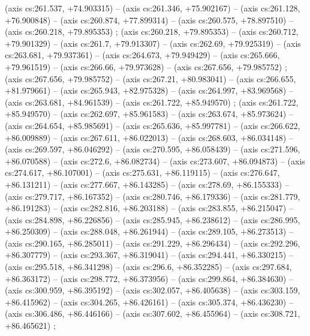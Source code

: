     (axis cs:261.537,    +74.903315) --  (axis cs:261.346,    +75.902167) --  (axis cs:261.128,    +76.900848) --  (axis cs:260.874,    +77.899314) --  (axis cs:260.575,    +78.897510) --  (axis cs:260.218,    +79.895353) ;
    (axis cs:260.218,    +79.895353) --  (axis cs:260.712,    +79.901329) --  (axis cs:261.7,    +79.913307) --  (axis cs:262.69,    +79.925319) --  (axis cs:263.681,    +79.937361) --  (axis cs:264.673,    +79.949429) --  (axis cs:265.666,    +79.961519) --  (axis cs:266.66,    +79.973628) --  (axis cs:267.656,    +79.985752) ;
    (axis cs:267.656,    +79.985752) --  (axis cs:267.21,    +80.983041) --  (axis cs:266.655,    +81.979661) --  (axis cs:265.943,    +82.975328) --  (axis cs:264.997,    +83.969568) --  (axis cs:263.681,    +84.961539) --  (axis cs:261.722,    +85.949570) ;
    (axis cs:261.722,    +85.949570) --  (axis cs:262.697,    +85.961583) --  (axis cs:263.674,    +85.973624) --  (axis cs:264.654,    +85.985691) --  (axis cs:265.636,    +85.997781) --  (axis cs:266.622,    +86.009889) --  (axis cs:267.611,    +86.022013) --  (axis cs:268.603,    +86.034148) --  (axis cs:269.597,    +86.046292) --  (axis cs:270.595,    +86.058439) --  (axis cs:271.596,    +86.070588) --  (axis cs:272.6,    +86.082734) --  (axis cs:273.607,    +86.094873) --  (axis cs:274.617,    +86.107001) --  (axis cs:275.631,    +86.119115) --  (axis cs:276.647,    +86.131211) --  (axis cs:277.667,    +86.143285) --  (axis cs:278.69,    +86.155333) --  (axis cs:279.717,    +86.167352) --  (axis cs:280.746,    +86.179336) --  (axis cs:281.779,    +86.191283) --  (axis cs:282.816,    +86.203188) --  (axis cs:283.855,    +86.215047) --  (axis cs:284.898,    +86.226856) --  (axis cs:285.945,    +86.238612) --  (axis cs:286.995,    +86.250309) --  (axis cs:288.048,    +86.261944) --  (axis cs:289.105,    +86.273513) --  (axis cs:290.165,    +86.285011) --  (axis cs:291.229,    +86.296434) --  (axis cs:292.296,    +86.307779) --  (axis cs:293.367,    +86.319041) --  (axis cs:294.441,    +86.330215) --  (axis cs:295.518,    +86.341298) --  (axis cs:296.6,    +86.352285) --  (axis cs:297.684,    +86.363172) --  (axis cs:298.772,    +86.373956) --  (axis cs:299.864,    +86.384630) --  (axis cs:300.959,    +86.395192) --  (axis cs:302.057,    +86.405638) --  (axis cs:303.159,    +86.415962) --  (axis cs:304.265,    +86.426161) --  (axis cs:305.374,    +86.436230) --  (axis cs:306.486,    +86.446166) --  (axis cs:307.602,    +86.455964) --  (axis cs:308.721,    +86.465621) ;
